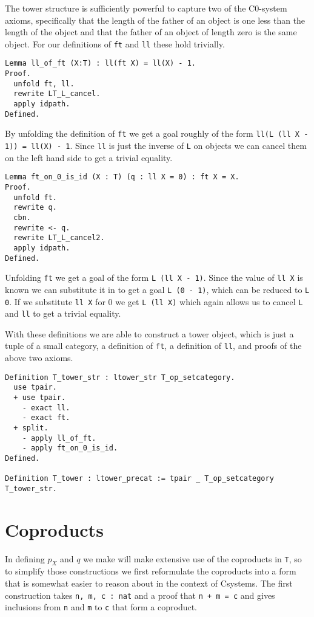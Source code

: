 The tower structure is sufficiently powerful to capture two of the C0-system
axioms, specifically that the length of the father of an object is one less than
the length of the object and that the father of an object of length zero is the
same object. For our definitions of \lstinline|ft| and \lstinline|ll| these hold
trivially.
\begin{lstlisting}
Lemma ll_of_ft (X:T) : ll(ft X) = ll(X) - 1.
Proof.
  unfold ft, ll.
  rewrite LT_L_cancel.
  apply idpath.
Defined.
\end{lstlisting}

By unfolding the definition of \lstinline|ft| we get a goal roughly of the form 
\lstinline|ll(L (ll X - 1)) = ll(X) - 1|. Since \lstinline|ll| is just the inverse of
\lstinline|L| on objects we can cancel them on the left hand side to get a trivial
equality. 

\begin{lstlisting}
Lemma ft_on_0_is_id (X : T) (q : ll X = 0) : ft X = X.
Proof.
  unfold ft.
  rewrite q.
  cbn.
  rewrite <- q.
  rewrite LT_L_cancel2.
  apply idpath.
Defined.
\end{lstlisting}

Unfolding \lstinline|ft| we get a goal of the form \lstinline|L (ll X - 1)|. Since the
value of \lstinline|ll X| is known we can substitute it in to get a goal 
\lstinline|L (0 - 1)|, which can be reduced to \lstinline|L 0|. If we substitute 
\lstinline|ll X| for 0 we get \lstinline|L (ll X)| which again allows us to cancel
\lstinline|L| and \lstinline|ll| to get a trivial equality.

With these definitions we are able to construct a tower object, which is just a
tuple of a small category, a definition of \lstinline|ft|, a definition of \lstinline|ll|,
and proofs of the above two axioms.
\begin{lstlisting}
Definition T_tower_str : ltower_str T_op_setcategory.
  use tpair.
  + use tpair.
    - exact ll.
    - exact ft.
  + split.
    - apply ll_of_ft.
    - apply ft_on_0_is_id.
Defined.

Definition T_tower : ltower_precat := tpair _ T_op_setcategory T_tower_str.
\end{lstlisting}

\section{Coproducts}
In defining $p_X$ and $q$ we make will make extensive use of the coproducts in
\lstinline|T|, so to simplify those constructions we first reformulate the coproducts
into a form that is somewhat easier to reason about in the context of Csystems.
The first construction takes \lstinline|n, m, c : nat| and a proof that 
\lstinline|n + m = c| and gives inclusions from \lstinline|n| and \lstinline|m| to \lstinline|c|
that form a coproduct.

